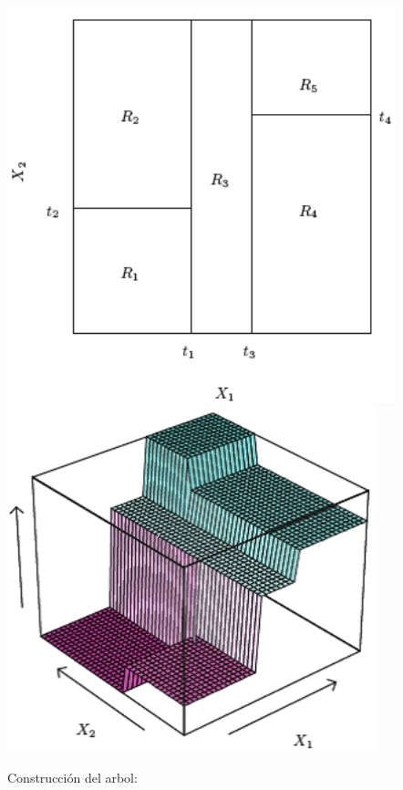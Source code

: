 \documentclass[]{book}
\begin{document}
\includegraphics[width=4.44in]{images/arbol2}
\includegraphics[width=4.22in]{images/arbol3}

Construcción del arbol:
\end{document}

